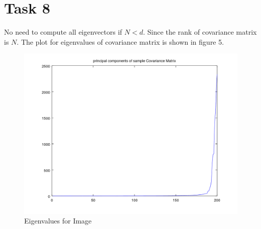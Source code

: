 \documentclass[11pt]{article}
\theoremstyle{plain}
\theoremstyle{definition}
\begin{document}
\section{Task 8}
No need to compute all eigenvectors if $N < d$. Since the rank of covariance matrix is $N$.  The plot for eigenvalues of covariance matrix is shown in figure 5. 
\begin{figure}
  \centering 
  \includegraphics[width=.5\linewidth]{Task 8.png}
  \caption{Eigenvalues for Image}
  \label{fig:Eigenvalues for Image}
\end{figure}
\end{document}
